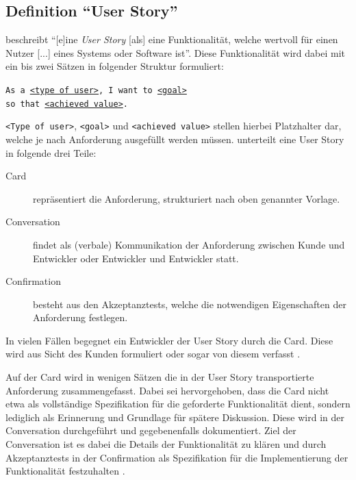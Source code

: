 \documentclass[acmtog]{acmart}
\begin{document}
\subsection{Definition ``User Story''}
\cite[p. 4]{cohn_user_2004} beschreibt ``[e]ine \emph{User Story} [als] eine Funktionalität, welche wertvoll für einen Nutzer [...] eines Systems
oder Software ist''.
Diese Funktionalität wird dabei mit ein bis zwei Sätzen in folgender Struktur formuliert:

\vspace{1em}
\texttt{As a \underline{<type of user>}, I want to \underline{<goal>}\\
	\hspace*{13em} so that \underline{<achieved value>}.}
\begin{flushright}
	\cite[p. 499]{balzert09}
\end{flushright}


\vspace{.5em}

\verb|<Type of user>|, \verb|<goal>| und \verb|<achieved value>| stellen hierbei Platzhalter dar,
welche je nach Anforderung ausgefüllt werden müssen.
\cite{jeffries_essential_2001} unterteilt eine User Story in folgende drei Teile:
\begin{description}
	\item[Card] repräsentiert die Anforderung, strukturiert nach oben genannter Vorlage.
	\item[Conversation] findet als (verbale) Kommunikation der Anforderung zwischen Kunde und Entwickler oder Entwickler und Entwickler statt.
	\item[Confirmation] besteht aus den Akzeptanztests, welche die notwendigen Eigenschaften der Anforderung festlegen.
\end{description}

In vielen Fällen begegnet ein Entwickler der User Story durch die Card.
Diese wird aus Sicht des Kunden formuliert oder sogar von diesem verfasst \cite[p. 497]{balzert09}.

Auf der Card wird in wenigen Sätzen die in der User Story transportierte Anforderung zusammengefasst.
Dabei sei hervorgehoben, dass die Card nicht etwa als vollständige Spezifikation für die geforderte Funktionalität dient,
sondern lediglich als Erinnerung und Grundlage für spätere Diskussion.
Diese wird in der Conversation durchgeführt und gegebenenfalls dokumentiert.
Ziel der Conversation ist es dabei die Details der Funktionalität zu klären
und durch Akzeptanztests in der Confirmation als Spezifikation für die Implementierung
der Funktionalität festzuhalten \cite[p. 4]{cohn_user_2004}.
\end{document}
